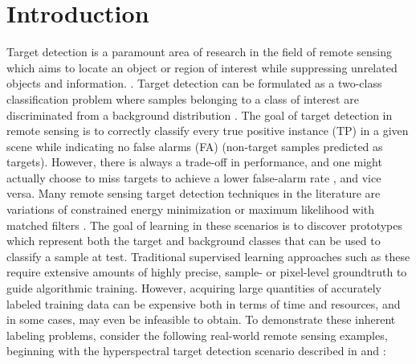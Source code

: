 \chapter{Introduction}
\vspace{1cm}

Target detection is a paramount area of research in the field of remote sensing which aims to locate an object or region of interest while suppressing unrelated objects and information. \citep{Geng2017TargetDetection,Chaudhuri1995TargetDetection}.  Target detection can be formulated as a two-class classification problem where samples belonging to a class of interest are discriminated from a background distribution \citep{Zare2016MIACE}.  The goal of target detection in remote sensing is to correctly classify every true positive instance (TP) in a given scene while indicating no false alarms (FA) (non-target samples predicted as targets).  However, there is always a trade-off in performance, and one might actually choose to miss targets to achieve a lower false-alarm rate \citep{WeinbergerFalseAlarms}, and vice versa. Many remote sensing target detection techniques in the literature are variations of constrained energy minimization or maximum likelihood with matched filters \citep{Geng2017TargetDetection,Chaudhuri1995TargetDetection}. The goal of learning in these scenarios is to discover prototypes which represent both the target and background classes that can be used to classify a sample at test.  Traditional supervised learning approaches such as these require extensive amounts of highly precise, sample- or pixel-level groundtruth to guide algorithmic training.  However, acquiring large quantities  of accurately labeled training data can be expensive both in terms of time and resources, and in some cases, may even be infeasible to obtain.  To demonstrate these inherent labeling problems, consider the following real-world remote sensing examples, beginning with the hyperspectral target detection scenario described in \citep{Du2017Thesis} and \citep{Bocinsky2019Thesis}:

